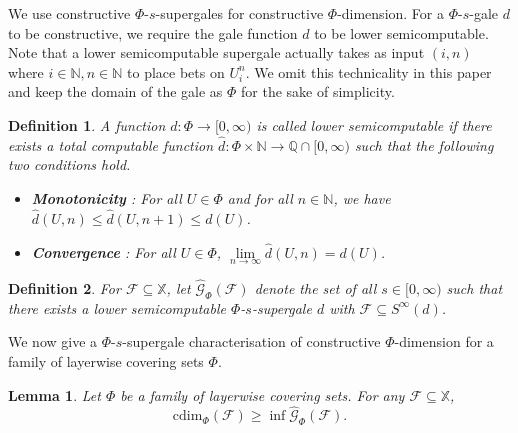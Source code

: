 \documentclass[11pt]{article}
\newtheorem{lemma}{Lemma}
\newtheorem{definition}{Definition}
\newcommand{\N}{\mathbb{N}}
\newcommand{\cdim}{\mathrm{cdim}}
\newcommand{\X}{{\mathbb{X}}}
\newcommand{\Rplus}{[0,\infty)}
\newcommand{\U}{U}
\begin{document}
We use constructive $\Phi$-$s$-supergales for constructive $\Phi$-dimension. For a  $\Phi$-$s$-gale $d$ to be constructive, we require the gale function $d$ to be lower semicomputable. Note that a lower semicomputable supergale actually takes as input $(i,n)$ where $i \in \N, n \in \N$ to place bets on $ U_i^n$. We omit this technicality in this paper and keep the domain of the gale as $\Phi$ for the sake of simplicity. 

\begin{definition} \label{def:lowerscfn}
	A function $d : \Phi \longrightarrow \Rplus$ is called
	\emph{lower semicomputable} if there exists a total computable
	function $\hat{d} : \Phi \times \mathbb{N} \longrightarrow
	\mathbb{Q} \cap \Rplus $ such that the following two
	conditions hold.
	\begin{itemize}
		\item \textbf{Monotonicity} : For all $\U \in \Phi$ and
		for all $n \in \mathbb{N}$, we have $ \hat{d}(\U,n) \leq
		\hat{d}(\U,n+1) \leq d(\U)$.
		\item \textbf{Convergence} : For all $U \in \Phi$,
		$\lim\limits_{n\to\infty} \hat{d}(\U,n) = d(\U)$.
	\end{itemize}
\end{definition}


\begin{definition}
	For $\mathcal{F} \subseteq \X$, let $\hat{\mathcal{G}}_{\Phi}(\mathcal{F})$
	denote the set of all $s \in \Rplus$ such that there exists a lower
	semicomputable $\Phi$-$s$-supergale $d$ with $\mathcal{F}
	\subseteq S^\infty (d)$.  
\end{definition}

We now give a $\Phi$-$s$-supergale characterisation of constructive $\Phi$-dimension for a family of layerwise covering sets $\Phi$.


\begin{lemma} \label{lem:CdimPhiGales1}
	Let $\Phi$ be a family of layerwise covering sets. For any  $\mathcal{F}
	\subseteq \X$, $$\cdim_{\Phi}(\mathcal{F}) \geq \inf
	\hat{\mathcal{G}}_{\Phi}(\mathcal{F}).$$
\end{lemma}
\end{document}
